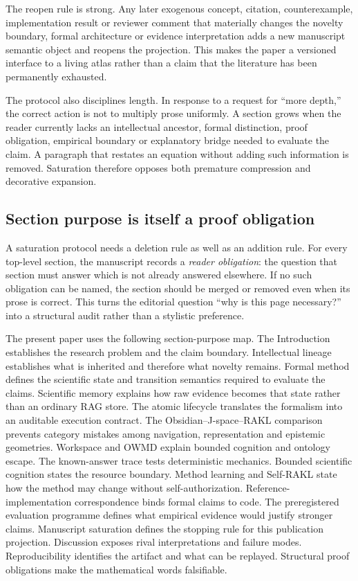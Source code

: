 The reopen rule is strong. Any later exogenous concept, citation, counterexample, implementation result or reviewer comment that materially changes the novelty boundary, formal architecture or evidence interpretation adds a new manuscript semantic object and reopens the projection. This makes the paper a versioned interface to a living atlas rather than a claim that the literature has been permanently exhausted.

The protocol also disciplines length. In response to a request for ``more depth,'' the correct action is not to multiply prose uniformly. A section grows when the reader currently lacks an intellectual ancestor, formal distinction, proof obligation, empirical boundary or explanatory bridge needed to evaluate the claim. A paragraph that restates an equation without adding such information is removed. Saturation therefore opposes both premature compression and decorative expansion.

\subsection{Section purpose is itself a proof obligation}

A saturation protocol needs a deletion rule as well as an addition rule. For every top-level section, the manuscript records a \emph{reader obligation}: the question that section must answer which is not already answered elsewhere. If no such obligation can be named, the section should be merged or removed even when its prose is correct. This turns the editorial question ``why is this page necessary?'' into a structural audit rather than a stylistic preference.

The present paper uses the following section-purpose map. The Introduction establishes the research problem and the claim boundary. Intellectual lineage establishes what is inherited and therefore what novelty remains. Formal method defines the scientific state and transition semantics required to evaluate the claims. Scientific memory explains how raw evidence becomes that state rather than an ordinary RAG store. The atomic lifecycle translates the formalism into an auditable execution contract. The Obsidian--J-space--RAKL comparison prevents category mistakes among navigation, representation and epistemic geometries. Workspace and OWMD explain bounded cognition and ontology escape. The known-answer trace tests deterministic mechanics. Bounded scientific cognition states the resource boundary. Method learning and Self-RAKL state how the method may change without self-authorization. Reference-implementation correspondence binds formal claims to code. The preregistered evaluation programme defines what empirical evidence would justify stronger claims. Manuscript saturation defines the stopping rule for this publication projection. Discussion exposes rival interpretations and failure modes. Reproducibility identifies the artifact and what can be replayed. Structural proof obligations make the mathematical words falsifiable.

